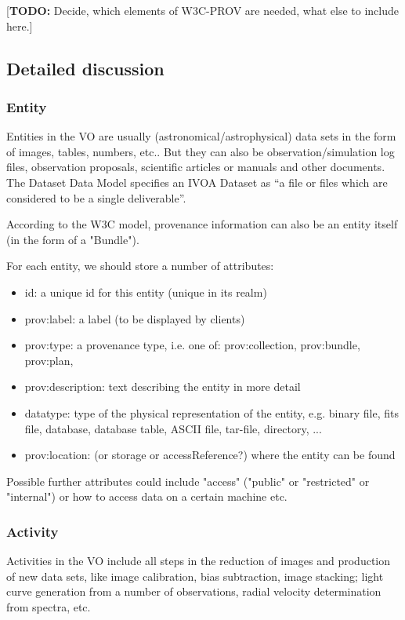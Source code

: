 \documentclass[11pt,a4paper]{ivoa}
\newcommand{\TODO}[1]{\noindent \textcolor{todocolor}{[\textbf{TODO:} #1]}}
\begin{document}
\TODO{Decide, which elements of W3C-PROV are needed, what else to include here.}


\subsection{Detailed discussion}

\subsubsection{Entity}
Entities in the VO are usually (astronomical/astrophysical) data sets in the form of images, tables, numbers, etc.. But they can also be observation/simulation log files, observation proposals, scientific articles or manuals and other documents. The Dataset Data Model\cite{std:DatasetDM} specifies an IVOA Dataset as ``a file or files which are considered to be a single deliverable''. 

According to the W3C model,  provenance information can also be an entity itself (in the form of a "Bundle").

For each entity, we should store a number of attributes:
\begin{itemize}
\item id: a unique id for this entity (unique in its realm)
\item prov:label: a label (to be displayed by clients)
\item prov:type: a provenance type, i.e. one of: prov:collection, prov:bundle, prov:plan, 
\item prov:description: text describing the entity in more detail
\item datatype: type of the physical representation of the entity, e.g. binary file, fits file, database, database table, ASCII file, tar-file, directory, ...
\item prov:location: (or storage or accessReference?) where the entity can be found
\end{itemize}

Possible further attributes could include "access" ("public" or "restricted" or 
"internal") or how to access data on a certain machine etc.


\subsubsection{Activity}
Activities in the VO include all steps in the reduction of images and production of new data sets, like image calibration, bias subtraction, image stacking; light curve generation from a number of observations, radial velocity determination from spectra, etc.
\end{document}
